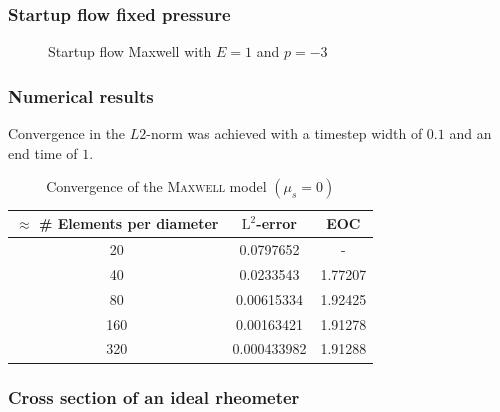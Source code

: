 \documentclass[12pt,a4paper,handout]{beamer}
\theoremstyle{definition}
\theoremstyle{plain}
\begin{document}
\begin{frame}
    \frametitle{Startup flow fixed pressure}
    \begin{figure}
        \caption{Startup flow Maxwell with $E=1$ and $p=-3$}
    \end{figure}
\end{frame}
\begin{frame}
    \frametitle{Numerical results}
    Convergence in the $L2$-norm was achieved with a timestep width of $0.1$ and an end time of $1$.
    \begin{table}
        \centering
        \begin{tabular}{c|c|c}
            $\approx$ \# Elements per diameter& $\mathrm{L}^2$-error&EOC\\
            \hline
            20 & 0.0797652 & -\\
            40 & 0.0233543 & 1.77207\\
            80 & 0.00615334 & 1.92425\\
            160 & 0.00163421 & 1.91278\\
            320 & 0.000433982 & 1.91288
        \end{tabular}
        \caption{Convergence of the \textsc{Maxwell} model $(\mu_s=0)$}
    \end{table}
\end{frame}
\begin{frame}
    \frametitle{Cross section of an ideal rheometer}
    
\end{frame}
\end{document}
